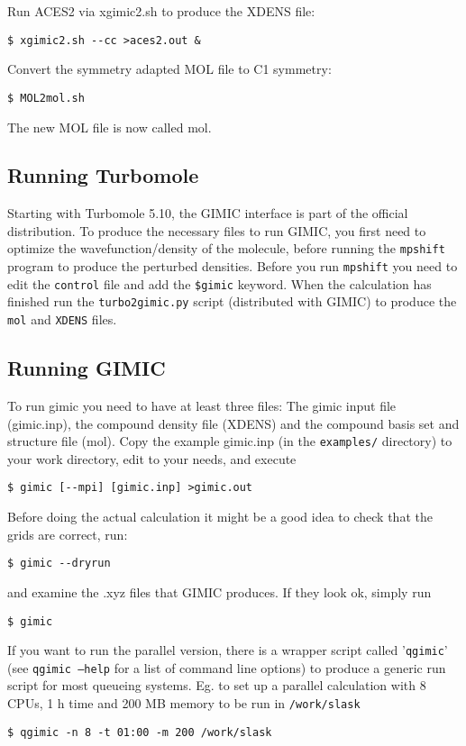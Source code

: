 \documentclass[a4paper,11pt]{article}
\begin{document}
Run ACES2 via xgimic2.sh to produce the XDENS file:
\begin{verbatim}
$ xgimic2.sh --cc >aces2.out &
\end{verbatim}

Convert the symmetry adapted MOL file to C1 symmetry: 
\begin{verbatim}
$ MOL2mol.sh
\end{verbatim}
The new MOL file is now called mol.

\subsection{Running Turbomole}
Starting with Turbomole 5.10, the GIMIC interface is part of the official
distribution. To produce the necessary files to run GIMIC, you first need to
optimize the wavefunction/density of the molecule, before running the 
\texttt{mpshift} program to produce the perturbed densities.
Before you run \texttt{mpshift} you need to edit the \texttt{control} file and 
add the \texttt{\$gimic} keyword. When the calculation has finished run the
\texttt{turbo2gimic.py} script (distributed with GIMIC) to produce the
\texttt{mol} and \texttt{XDENS} files.

\subsection{Running GIMIC}
To run gimic you need to have at least three files: The gimic input file
(gimic.inp), the compound density file (XDENS) and the compound basis set and
structure file (mol). Copy the example gimic.inp (in the \texttt{examples/}
directory) to your work directory, edit to your needs, and execute
\begin{verbatim}
$ gimic [--mpi] [gimic.inp] >gimic.out
\end{verbatim}

Before doing the actual calculation it might be a good idea to check that the
grids are correct, run:
\begin{verbatim}
$ gimic --dryrun
\end{verbatim}
and examine the .xyz files that GIMIC produces. If they look ok, simply run
\begin{verbatim}
$ gimic 
\end{verbatim}

If you want to run the parallel version, there is a wrapper script called
'\texttt{qgimic}' (see \texttt{qgimic --help} for a list of command line
options) to produce a generic run script for most queueing systems. Eg. to set
up a parallel calculation with 8 CPUs, 1 h time and 200 MB memory to be run in
\texttt{/work/slask}
\begin{verbatim}
$ qgimic -n 8 -t 01:00 -m 200 /work/slask
\end{verbatim}
\end{document}
